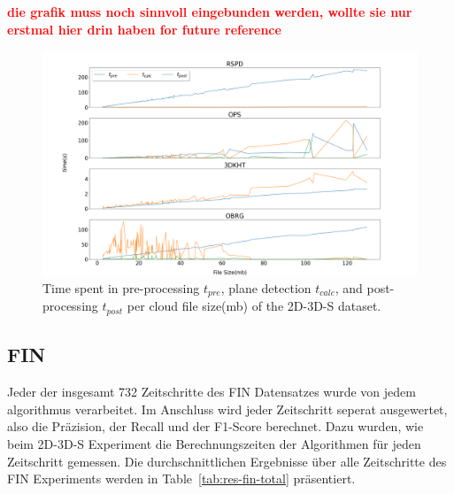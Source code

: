 \documentclass[main.tex]{subfiles}
\begin{document}
\textbf{\textcolor{red}{die grafik muss noch sinnvoll eingebunden werden, wollte sie nur erstmal hier drin haben for future reference}}
\begin{figure}[H]
    \centering
    \includegraphics[width=\textwidth]{images/time_size_2d3ds.png}
    \caption[Time per Cloud size 2D-3D-S]{Time spent in pre-processing $t_{pre}$, plane detection $t_{calc}$, and post-processing
        $t_{post}$ per cloud file size(mb) of the 2D-3D-S dataset.}
    \label{fig:sizetimestanford}
\end{figure}


\subsection{FIN}
Jeder der insgesamt 732 Zeitschritte des FIN Datensatzes wurde von jedem algorithmus verarbeitet. Im Anschluss wird
jeder Zeitschritt seperat ausgewertet, also die Präzision, der Recall und der F1-Score berechnet. Dazu
wurden, wie beim 2D-3D-S Experiment die Berechnungszeiten der Algorithmen für jeden Zeitschritt gemessen.
Die durchschnittlichen Ergebnisse über alle Zeitschritte des FIN Experiments werden
in Table~\ref{tab:res-fin-total} präsentiert.
\end{document}
